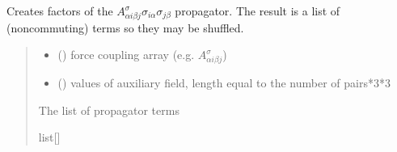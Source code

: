 \documentclass[letterpaper,10pt,english]{sphinxmanual}
\begin{document}
\begin{fulllineitems}

\begin{fulllineitems}
\label{\detokenize{spinbox:spinbox.core.HilbertPropagatorHS.factors_sigma}}
\pysigstartsignatures
{}
\pysigstopsignatures
\sphinxAtStartPar
Creates factors of the \(A^\sigma_{\alpha i \beta j} \sigma_{i \alpha} \sigma_{j \beta}\) propagator. 
The result is a list of (noncommuting) terms so they may be shuffled.
\begin{quote}\begin{description}
\begin{itemize}
\item {} 
\sphinxAtStartPar
{} ({\hyperref[\detokenize{spinbox:spinbox.core.Coupling}]{}}) \textendash{} force coupling array (e.g. \(A^\sigma_{\alpha i \beta j}\))

\item {} 
\sphinxAtStartPar
{} () \textendash{} values of auxiliary field, length equal to the number of pairs*3*3

\end{itemize}

\sphinxAtStartPar
The list of propagator terms

\sphinxAtStartPar
list{[}{\hyperref[\detokenize{spinbox:spinbox.core.HilbertOperator}]{}}{]}

\end{description}\end{quote}

\end{fulllineitems}



\end{fulllineitems}
\end{document}
